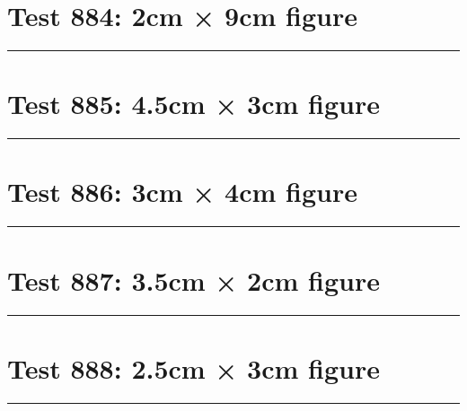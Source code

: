 \documentclass[a4paper,11pt]{article}
\begin{document}
\section*{Test 884: 2cm × 9cm figure}
\begin{swarmwrap}%
  \begin{minipage}[t]{2cm}
    \centering
    \rule{\linewidth}{9cm}
  \end{minipage}%
\end{swarmwrap}%
\swarmwrapnext
\lipsum[86]
\lipsum[87]
\lipsum[88]
\lipsum[89]
\section*{Test 885: 4.5cm × 3cm figure}
\begin{swarmwrap}%
  \begin{minipage}[t]{4cm}
    \centering
    \rule{\linewidth}{3cm}
  \end{minipage}%
\end{swarmwrap}%
\swarmwrapnext
\lipsum[90]
\lipsum[91]
\lipsum[92]
\lipsum[93]
\section*{Test 886: 3cm × 4cm figure}
\begin{swarmwrap}%
  \begin{minipage}[t]{3cm}
    \centering
    \rule{\linewidth}{4cm}
  \end{minipage}%
\end{swarmwrap}%
\swarmwrapnext
\lipsum[87]
\lipsum[88]
\lipsum[89]
\section*{Test 887: 3.5cm × 2cm figure}
\begin{swarmwrap}%
  \begin{minipage}[t]{3cm}
    \centering
    \rule{\linewidth}{2cm}
  \end{minipage}%
\end{swarmwrap}%
\swarmwrapnext
\lipsum[55]
\lipsum[56]
\lipsum[57]
\lipsum[58]
\lipsum[59]
\section*{Test 888: 2.5cm × 3cm figure}
\begin{swarmwrap}%
  \begin{minipage}[t]{2cm}
    \centering
    \rule{\linewidth}{3cm}
  \end{minipage}%
\end{swarmwrap}%
\swarmwrapnext
\lipsum[67]
\lipsum[68]
\lipsum[69]
\lipsum[70]
\lipsum[71]
\end{document}
